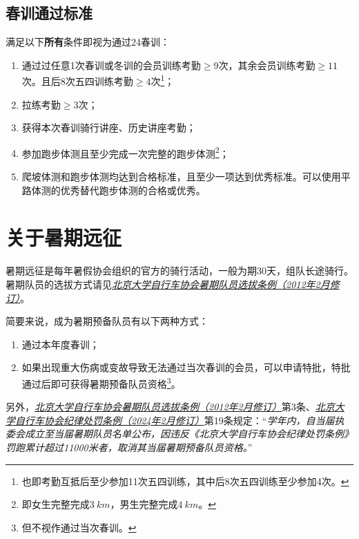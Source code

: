 \documentclass[UTF8]{ctexart}
\begin{document}
\subsection{春训通过标准}

满足以下\textbf{所有}条件即视为通过24春训：
\begin{enumerate}[nosep,left=4em]
    \item 通过过任意1次春训或冬训的会员训练考勤$\ge 9$次，其余会员训练考勤$\ge 11$次。且后8次五四训练考勤$\ge 4$次\footnote{也即考勤互抵后至少参加11次五四训练，其中后8次五四训练至少参加4次。}；
    \item 拉练考勤$\ge 3$次；
    \item 获得本次春训骑行讲座、历史讲座考勤；
    \item 参加跑步体测且至少完成一次完整的跑步体测\footnote{即女生完整完成$\SI{3}{km}$，男生完整完成$\SI{4}{km}$。}；
    \item 爬坡体测和跑步体测均达到合格标准，且至少一项达到优秀标准。可以使用平路体测的优秀替代跑步体测的合格或优秀。
\end{enumerate}

\section{关于暑期远征}

暑期远征是每年暑假协会组织的官方的骑行活动，一般为期30天，组队长途骑行。暑期队员的选拔方式请见\href{https://chexie.net/bbs/content/?bid=1&tid=9610&p=1}{\textit{北京大学自行车协会暑期队员选拔条例（2012年2月修订）}}。

简要来说，成为暑期预备队员有以下两种方式：
\begin{enumerate}[nosep,left=4em]
    \item 通过本年度春训；
    \item 如果出现重大伤病或变故导致无法通过当次春训的会员，可以申请特批，特批通过后即可获得暑期预备队员资格\footnote{但不视作通过当次春训。}。
\end{enumerate}

另外，\href{https://chexie.net/bbs/content/?bid=1&tid=9610&p=1}{\textit{北京大学自行车协会暑期队员选拔条例（2012年2月修订）}}第3条、\href{https://chexie.net/bbs/content/?bid=1&tid=9751&p=1}{\textit{北京大学自行车协会纪律处罚条例（2024年2月修订）}}第19条规定：“\textit{学年内，自当届执委会成立至当届暑期队员名单公布，因违反《北京大学自行车协会纪律处罚条例》罚跑累计超过11000米者，取消其当届暑期预备队员资格。}”

\end{document}
